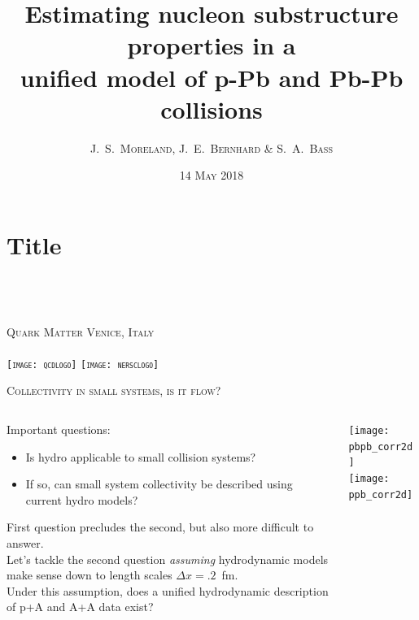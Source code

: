 \documentclass[aspectratio=169]{beamer}
\title{Estimating nucleon substructure properties in a\\[.2ex]
unified model of p-Pb and Pb-Pb collisions}
\author[J.\ S.\ Moreland]{\scshape J.\ S.\ Moreland, J.\ E.\ Bernhard \& S.\ A.\ Bass}
\institute[Duke]{\scshape Duke University}
\date{\scshape 14 May 2018}
\newcommand{\conference}{\scshape Quark Matter \enskip\textbar\enskip Venice, Italy}
\begin{document}
\section{Title}

\begin{frame}
  \centering
  \textcolor{theme}{\Large \inserttitle} \\[3ex]
  \insertauthor \\
  \insertinstitute \\[2ex]
  \conference \\
  \insertdate \\[6ex]
  \texttt{[image: qcdlogo]}\quad
  \texttt{[image: nersclogo]}\\[3ex]
\end{frame}


\newcommand{\boxtitle}[1]{\textbf{#1}\\[.5ex]}

\begin{frame}{\scshape Collectivity in small systems, is it flow?}
  \smallskip
  \begin{columns}[T]
    \begin{column}{.62\textwidth}
      \bigskip
      Important questions:\\
      \begin{itemize}
        \item Is hydro applicable to small collision systems?
        \item If so, can small system collectivity be described using current hydro models?
      \end{itemize}
      \smallskip
      First question precludes the second, but also more difficult to answer.\\[1ex]
      Let's tackle the second question \textit{assuming} hydrodynamic models make
      sense down to length scales $\Delta x=.2$~fm.\\[1ex]
      Under this assumption, does a unified hydrodynamic description of p+A and A+A data exist?
    \end{column}
    \begin{column}{.3\textwidth}
      \centering
      \texttt{[image: pbpb\_corr2d]}\\
      \texttt{[image: ppb\_corr2d]}
    \end{column}
  \end{columns}

\end{frame}
\end{document}
